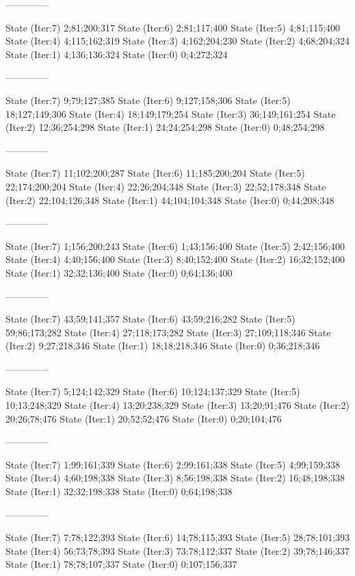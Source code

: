 \documentclass[a4paper,10pt,ngerman]{scrartcl}
\begin{document}
\begin{lstcs}
--------------

State (Iter:7) {2;81;200;317}
State (Iter:6) {2;81;117;400}
State (Iter:5) {4;81;115;400}
State (Iter:4) {4;115;162;319}
State (Iter:3) {4;162;204;230}
State (Iter:2) {4;68;204;324}
State (Iter:1) {4;136;136;324}
State (Iter:0) {0;4;272;324}

--------------

State (Iter:7) {9;79;127;385}
State (Iter:6) {9;127;158;306}
State (Iter:5) {18;127;149;306}
State (Iter:4) {18;149;179;254}
State (Iter:3) {36;149;161;254}
State (Iter:2) {12;36;254;298}
State (Iter:1) {24;24;254;298}
State (Iter:0) {0;48;254;298}

--------------

State (Iter:7) {11;102;200;287}
State (Iter:6) {11;185;200;204}
State (Iter:5) {22;174;200;204}
State (Iter:4) {22;26;204;348}
State (Iter:3) {22;52;178;348}
State (Iter:2) {22;104;126;348}
State (Iter:1) {44;104;104;348}
State (Iter:0) {0;44;208;348}

--------------

State (Iter:7) {1;156;200;243}
State (Iter:6) {1;43;156;400}
State (Iter:5) {2;42;156;400}
State (Iter:4) {4;40;156;400}
State (Iter:3) {8;40;152;400}
State (Iter:2) {16;32;152;400}
State (Iter:1) {32;32;136;400}
State (Iter:0) {0;64;136;400}

--------------

State (Iter:7) {43;59;141;357}
State (Iter:6) {43;59;216;282}
State (Iter:5) {59;86;173;282}
State (Iter:4) {27;118;173;282}
State (Iter:3) {27;109;118;346}
State (Iter:2) {9;27;218;346}
State (Iter:1) {18;18;218;346}
State (Iter:0) {0;36;218;346}

--------------

State (Iter:7) {5;124;142;329}
State (Iter:6) {10;124;137;329}
State (Iter:5) {10;13;248;329}
State (Iter:4) {13;20;238;329}
State (Iter:3) {13;20;91;476}
State (Iter:2) {20;26;78;476}
State (Iter:1) {20;52;52;476}
State (Iter:0) {0;20;104;476}

--------------

State (Iter:7) {1;99;161;339}
State (Iter:6) {2;99;161;338}
State (Iter:5) {4;99;159;338}
State (Iter:4) {4;60;198;338}
State (Iter:3) {8;56;198;338}
State (Iter:2) {16;48;198;338}
State (Iter:1) {32;32;198;338}
State (Iter:0) {0;64;198;338}

--------------

State (Iter:7) {7;78;122;393}
State (Iter:6) {14;78;115;393}
State (Iter:5) {28;78;101;393}
State (Iter:4) {56;73;78;393}
State (Iter:3) {73;78;112;337}
State (Iter:2) {39;78;146;337}
State (Iter:1) {78;78;107;337}
State (Iter:0) {0;107;156;337}


\end{lstcs}
\end{document}
